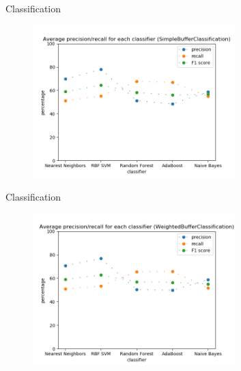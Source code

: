 \documentclass[]{beamer}
\begin{document}
	\begin{frame}{Classification}
		\begin{figure}
			\includegraphics[width=0.7\textwidth]{SimpleBufferClassification}
		\end{figure} 
	\end{frame}
	\begin{frame}{Classification}
		\begin{figure}
			\includegraphics[width=0.7\textwidth]{WeightedBufferClassification}
		\end{figure} 
	\end{frame}
\end{document}
